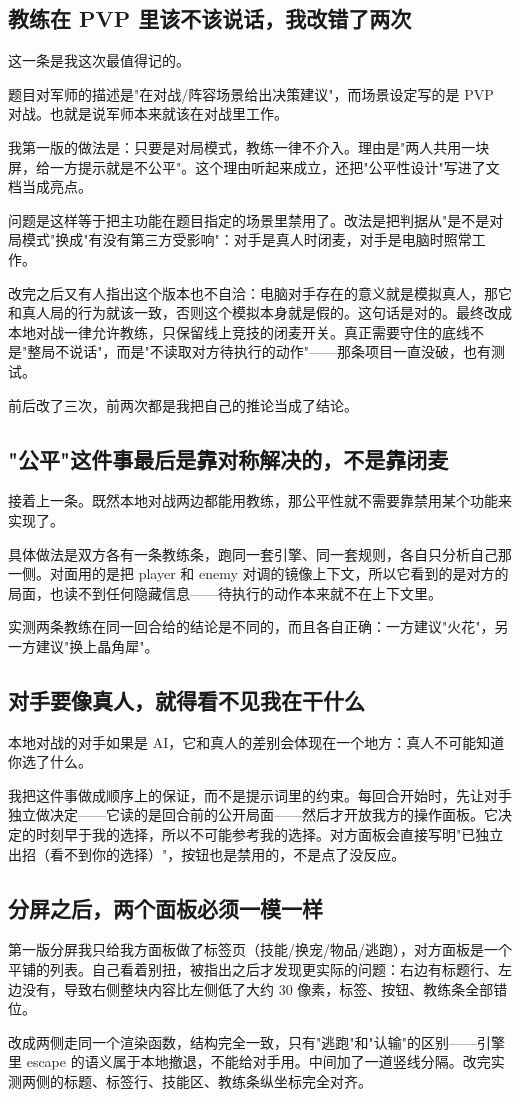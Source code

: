 \subsection{教练在 PVP 里该不该说话，我改错了两次}

这一条是我这次最值得记的。

题目对军师的描述是"在对战/阵容场景给出决策建议"，而场景设定写的是 PVP 对战。也就是说军师本来就该在对战里工作。

我第一版的做法是：只要是对局模式，教练一律不介入。理由是"两人共用一块屏，给一方提示就是不公平"。这个理由听起来成立，还把"公平性设计"写进了文档当成亮点。

问题是这样等于把主功能在题目指定的场景里禁用了。改法是把判据从"是不是对局模式"换成"有没有第三方受影响"：对手是真人时闭麦，对手是电脑时照常工作。

改完之后又有人指出这个版本也不自洽：电脑对手存在的意义就是模拟真人，那它和真人局的行为就该一致，否则这个模拟本身就是假的。这句话是对的。最终改成本地对战一律允许教练，只保留线上竞技的闭麦开关。真正需要守住的底线不是"整局不说话"，而是"不读取对方待执行的动作"——那条项目一直没破，也有测试。

前后改了三次，前两次都是我把自己的推论当成了结论。

\subsection{"公平"这件事最后是靠对称解决的，不是靠闭麦}

接着上一条。既然本地对战两边都能用教练，那公平性就不需要靠禁用某个功能来实现了。

具体做法是双方各有一条教练条，跑同一套引擎、同一套规则，各自只分析自己那一侧。对面用的是把 player 和 enemy 对调的镜像上下文，所以它看到的是对方的局面，也读不到任何隐藏信息——待执行的动作本来就不在上下文里。

实测两条教练在同一回合给的结论是不同的，而且各自正确：一方建议"火花"，另一方建议"换上晶角犀"。

\subsection{对手要像真人，就得看不见我在干什么}

本地对战的对手如果是 AI，它和真人的差别会体现在一个地方：真人不可能知道你选了什么。

我把这件事做成顺序上的保证，而不是提示词里的约束。每回合开始时，先让对手独立做决定——它读的是回合前的公开局面——然后才开放我方的操作面板。它决定的时刻早于我的选择，所以不可能参考我的选择。对方面板会直接写明"已独立出招（看不到你的选择）"，按钮也是禁用的，不是点了没反应。

\subsection{分屏之后，两个面板必须一模一样}

第一版分屏我只给我方面板做了标签页（技能/换宠/物品/逃跑），对方面板是一个平铺的列表。自己看着别扭，被指出之后才发现更实际的问题：右边有标题行、左边没有，导致右侧整块内容比左侧低了大约 30 像素，标签、按钮、教练条全部错位。

改成两侧走同一个渲染函数，结构完全一致，只有"逃跑"和"认输"的区别——引擎里 escape 的语义属于本地撤退，不能给对手用。中间加了一道竖线分隔。改完实测两侧的标题、标签行、技能区、教练条纵坐标完全对齐。
